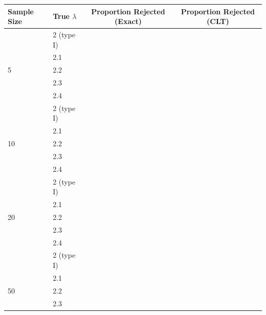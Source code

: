 \documentclass{article}\usepackage[]{graphicx}\usepackage[]{xcolor}
\begin{document}
\begin{enumerate}
\begin{enumerate}
\begin{table}[H]
\begin{tabular}{llcc}
      Sample Size & True $\lambda$ & Proportion Rejected (Exact) & Proportion Rejected (CLT) \\\hline
        &    2 (type I)  &                              &            \\
        &    2.1         &                              &            \\
5       &    2.2         &                              &            \\
        &    2.3         &                              &            \\
        &    2.4         &                              &            \\\hline
        &    2 (type I)  &                              &            \\
        &    2.1         &                              &            \\
10      &    2.2         &                              &            \\
        &    2.3         &                              &            \\
        &    2.4         &                              &            \\\hline
        &    2 (type I)  &                              &            \\
        &    2.1         &                              &            \\
20      &    2.2         &                              &            \\
        &    2.3         &                              &            \\
        &    2.4         &                              &            \\\hline
        &    2 (type I)  &                              &            \\
        &    2.1         &                              &            \\
50      &    2.2         &                              &            \\
        &    2.3         &                              &            \\

\end{tabular}
\end{table}
\end{enumerate}
\end{enumerate}
\end{document}
